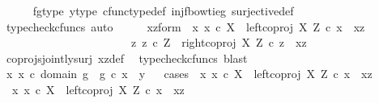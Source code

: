 \begin{isabellebody}
\ \ \ \ \isamarkupfalse%
\ fg{\isacharunderscore}{\kern0pt}type\ y{\isacharunderscore}{\kern0pt}type{}\ cfunc{\isacharunderscore}{\kern0pt}type{\isacharunderscore}{\kern0pt}def\ inj{\isacharunderscore}{\kern0pt}f{\isacharunderscore}{\kern0pt}bowtie{\isacharunderscore}{\kern0pt}g\ surjective{\isacharunderscore}{\kern0pt}def\ \isamarkupfalse%
\ {\isacharparenleft}{\kern0pt}typecheck{\isacharunderscore}{\kern0pt}cfuncs{\isacharcomma}{\kern0pt}\ auto{\isacharparenright}{\kern0pt}\isanewline
\ \ \isamarkupfalse%
\ \isamarkupfalse%
\ xz{\isacharunderscore}{\kern0pt}form{\isacharcolon}{\kern0pt}\ {\isachardoublequoteopen}{\isacharparenleft}{\kern0pt}{\isasymexists}\ x{\isachardot}{\kern0pt}\ x\ {\isasymin}\isactrlsub c\ X\ {\isasymand}\ left{\isacharunderscore}{\kern0pt}coproj\ X\ Z\ {\isasymcirc}\isactrlsub c\ x\ {\isacharequal}{\kern0pt}\ xz{\isacharparenright}{\kern0pt}\ {\isasymor}\ \ \isanewline
\ \ \ \ \ \ \ \ \ \ \ \ \ \ \ \ \ \ \ \ \ \ {\isacharparenleft}{\kern0pt}{\isasymexists}\ z{\isachardot}{\kern0pt}\ z\ {\isasymin}\isactrlsub c\ Z\ {\isasymand}\ right{\isacharunderscore}{\kern0pt}coproj\ X\ Z\ {\isasymcirc}\isactrlsub c\ z\ {\isacharequal}{\kern0pt}\ xz{\isacharparenright}{\kern0pt}{\isachardoublequoteclose}\isanewline
\ \ \ \ \isamarkupfalse%
\ coprojs{\isacharunderscore}{\kern0pt}jointly{\isacharunderscore}{\kern0pt}surj\ xz{\isacharunderscore}{\kern0pt}def\ \isamarkupfalse%
\ {\isacharparenleft}{\kern0pt}typecheck{\isacharunderscore}{\kern0pt}cfuncs{\isacharcomma}{\kern0pt}\ blast{\isacharparenright}{\kern0pt}\isanewline
\ \ \isamarkupfalse%
\ {\isachardoublequoteopen}{\isasymexists}x{\isachardot}{\kern0pt}\ x\ {\isasymin}\isactrlsub c\ domain\ g\ {\isasymand}\ g\ {\isasymcirc}\isactrlsub c\ x\ {\isacharequal}{\kern0pt}\ y{\isachardoublequoteclose}\isanewline
\ \ \isamarkupfalse%
{\isacharparenleft}{\kern0pt}cases\ {\isachardoublequoteopen}{\isasymexists}\ x{\isachardot}{\kern0pt}\ x\ {\isasymin}\isactrlsub c\ X\ {\isasymand}\ left{\isacharunderscore}{\kern0pt}coproj\ X\ Z\ {\isasymcirc}\isactrlsub c\ x\ {\isacharequal}{\kern0pt}\ xz{\isachardoublequoteclose}{\isacharparenright}{\kern0pt}\isanewline
\ \ \ \ \isamarkupfalse%
\ {\isachardoublequoteopen}{\isasymexists}\ x{\isachardot}{\kern0pt}\ x\ {\isasymin}\isactrlsub c\ X\ {\isasymand}\ left{\isacharunderscore}{\kern0pt}coproj\ X\ Z\ {\isasymcirc}\isactrlsub c\ x\ {\isacharequal}{\kern0pt}\ xz{\isachardoublequoteclose}\isanewline

\end{isabellebody}
